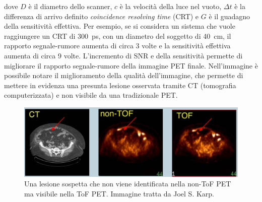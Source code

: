 dove $D$ è il diametro dello scanner, $c$ è la velocità della luce nel vuoto, $\Delta t$ è la differenza di arrivo definito \textit{coincidence resolving time} (CRT) e $G$ è il guadagno della sensitività  effettiva. Per esempio, se si considera un sistema che vuole raggiungere un CRT di \SI{300}{\pico\second}, con un diametro del soggetto di \SI{40}{\centi\meter}, il rapporto segnale-rumore aumenta di circa 3 volte e la sensitività effettiva aumenta di circa 9 volte. L'incremento di SNR e della sensitività permette di migliorare il rapporto segnale-rumore della immagine PET finale. Nell'immagine \cite{Karp2006} è possibile notare il miglioramento della qualità dell'immagine, che permette di mettere in evidenza una presunta lesione osservata tramite CT (tomografia computerizzata) e non visibile da una tradizionale PET.
\begin{figure}[tbh]
	\centering
	\includegraphics[width=\linewidth]{./ImageFiles/tof_image.jpg}
	\caption{Una lesione sospetta che non viene identificata nella non-ToF PET ma visibile nella ToF PET. Immagine tratta da Joel S. Karp.\cite{Karp2006}}
	\label{fig:tof_image}
\end{figure}
















